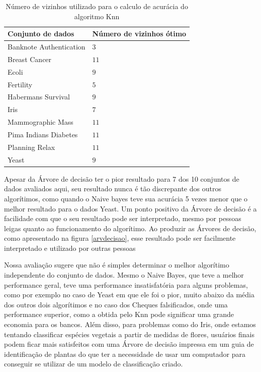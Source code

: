 \documentclass[12pt, a4paper]{article}
\begin{document}
\begin{table}[!ht]
\centering
\caption{Número de vizinhos utilizado para o calculo de acurácia do algoritmo Knn}
\label{vizinhos}
\begin{tabular}{|l|l|}
\hline
Conjunto de dados & Número de vizinhos ótimo  \\
\hline                              
Banknote Authentication		&$3$ \\
Breast Cancer               &$11$ \\
Ecoli                       &$9$ \\
Fertility                   &$5$ \\
Habermans Survival          &$9$ \\
Iris                        &$7$ \\
Mammographic Mass           &$11$ \\
Pima Indians Diabetes       &$11$ \\
Planning Relax              &$11$ \\
Yeast                       &$9$ \\

\hline
\end{tabular}

\end{table}

Apesar da Árvore de decisão ter o pior resultado para 7 dos 10 conjuntos de dados avaliados aqui, seu resultado nunca é tão discrepante dos outros algorítimos, como quando o Naive bayes teve sua acurácia 5 vezes menor que o melhor resultado para o dados Yeast. Um ponto positivo da Árvore de decisão é a facilidade com que o seu resultado pode ser interpretado, mesmo por pessoas leigas quanto ao funcionamento do algorítimo. Ao produzir as Árvores de decisão, como apresentado na figura \ref{arvdecisao}, esse resultado pode ser facilmente interpretado e utilizado por outras pessoas \citep{berzal_etal2003}

Nossa avaliação sugere que não é simples determinar o melhor algorítimo independente do conjunto de dados. Mesmo o Naive Bayes, que teve a melhor performance geral, teve uma performance insatisfatória para alguns problemas, como por exemplo no caso de Yeast em que ele foi o pior, muito abaixo da média dos outros dois algorítimos e no caso dos Cheques falsificados, onde uma performance superior, como a obtida pelo Knn pode significar uma grande economia para os bancos. Além disso, para problemas como do Iris, onde estamos tentando classificar espécies vegetais a partir de medidas de flores, usuários finais podem ficar mais satisfeitos com uma Árvore de decisão impressa em um guia de identificação de plantas do que ter a necessidade de usar um computador para conseguir se utilizar de um modelo de classificação criado.
\end{document}
